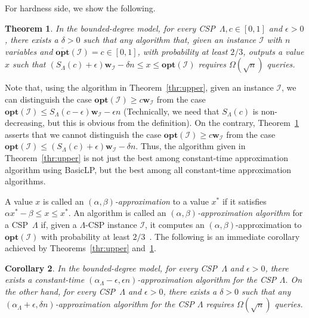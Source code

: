 \documentclass[letterpaper, 11pt]{article}
\newtheorem{theorem}{Theorem}[section]
\newtheorem{corollary}[theorem]{Corollary}
\newcommand{\calI}{\mathcal{I}}
\newcommand{\biw}{\boldsymbol{w}}
\newcommand{\blp}{\textsf{BasicLP}\xspace}
\newcommand{\opt}{\mathbf{opt}}
\newcommand{\olopt}{\overline{\mathbf{opt}}}
\begin{document}
For hardness side, we show the following.
\begin{theorem}\label{thr:lower}
  In the bounded-degree model,
  for every CSP~$\Lambda, c\in [0,1]$ and $\epsilon>0$,
  there exists a $\delta>0$ such that
  any algorithm that,
  given an instance $\calI$ with $n$ variables and $\olopt(\calI)=c \in [0,1]$,
  with probability at least $2/3$,
  outputs a value $x$ such that $(S_{\Lambda}(c)+\epsilon)\biw_{\calI} - \delta n \leq x \leq \opt(\calI)$ requires $\Omega(\sqrt{n})$ queries.
\end{theorem}
Note that, using the algorithm in Theorem~\ref{thr:upper}, given an instance $\calI$,
we can distinguish the case $\opt(\calI) \geq c\biw_{\calI}$ from the case $\opt(\calI) \leq S_{\Lambda}(c-\epsilon)\biw_{\calI}-\epsilon n$
(Technically, we need that $S_{\Lambda}(c)$ is non-decreasing, but this is obvious from the definition).
On the contrary, Theorem~\ref{thr:lower} asserts that we cannot distinguish the case $\opt(\calI) \geq c\biw_{\calI}$ from the case $\opt(\calI) \leq (S_{\Lambda}(c)+\epsilon)\biw_{\calI} - \delta n$.
Thus, the algorithm given in Theorem~\ref{thr:upper} is not just the best among constant-time approximation algorithm using \blp,
but the best among all constant-time approximation algorithms.

A value $x$ is called an \textit{$(\alpha,\beta)$-approximation} to a value $x^*$ if it satisfies $\alpha x^*-\beta \leq x \leq x^*$.
An algorithm is called an \textit{$(\alpha,\beta)$-approximation algorithm} for a CSP~$\Lambda$ if,
given a $\Lambda$-CSP instance $\calI$,
it computes an $(\alpha,\beta)$-approximation to $\opt(\calI)$ with probability at least $2/3$~\cite{NO08,PR07}.
The following is an immediate corollary achieved by Theorems~\ref{thr:upper} and~\ref{thr:lower}.
\begin{corollary}
  In the bounded-degree model, 
  for every CSP~$\Lambda$ and $\epsilon>0$,
  there exists a constant-time $(\alpha_\Lambda-\epsilon,\epsilon n)$-approximation algorithm for the CSP $\Lambda$.
  On the other hand, 
  for every CSP~$\Lambda$ and $\epsilon>0$, there exists a $\delta>0$ such that 
  any $(\alpha_\Lambda+\epsilon,\delta n)$-approximation algorithm for the CSP $\Lambda$ requires $\Omega(\sqrt{n})$ queries.
\end{corollary}
\end{document}
